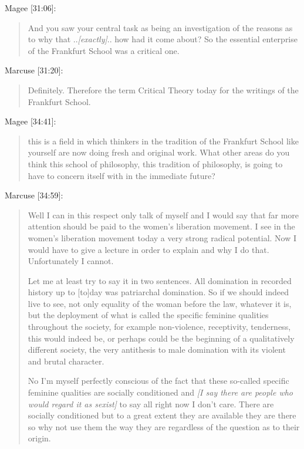 \documentclass[10pt,titlepage]{book}
\newcommand{\ignore}[1]{}
\begin{document}
Magee [31:06]:

\begin{quotation}
And you saw your central task as being an
investigation of the reasons as to why
that ..\emph{[exactly]}..
how had it come about?
So the essential enterprise of the Frankfurt School was a critical one.
\end{quotation}

Marcuse [31:20]:

\begin{quotation}
Definitely.
Therefore the term Critical Theory today for the writings of the Frankfurt School.
\end{quotation}

\ignore{
Magee [31:28]:
  \begin{quotation}
One thing that the members of the
Frankfurt School exhibited very
considerable concern with from the
beginning was the aesthetics, and this I
think differentiates it from most other
philosophies certainly from most other
political philosophies.
\end{quotation}
}%


Magee [34:41]:

\begin{quotation}

this is a field in which thinkers in the tradition of
the Frankfurt School like yourself are now doing fresh and original work.
What other areas do you think this school of philosophy,
this tradition of philosophy,
is going to have to concern itself with in the immediate future?
\end{quotation}

Marcuse [34:59]:

\begin{quotation}
Well I can in this respect only talk of myself and I would say that
far more attention should be paid to the women's liberation movement.
I see in the women's liberation movement today a very strong radical potential.
Now I would have to give a lecture in order to explain and why I do that.
Unfortunately I cannot.

Let me at least try to say it in two sentences.
All domination in recorded history up to [to]day was patriarchal domination.
So if we should indeed live to see, not only equality of the woman before the law,
whatever it is, but the deployment of what is called the specific feminine
qualities throughout the society, for example non-violence, receptivity,
tenderness, this would indeed be, or perhaps could be the beginning of a
qualitatively different society, the very antithesis to male domination with its
violent and brutal character.

No I'm myself perfectly conscious of the fact that these so-called specific
feminine qualities are socially conditioned and \emph{[I say there are people
who would regard it as sexist]} to say all right now I don't care.
There are socially conditioned but to a great extent they are available
they are there so why not use them the way they are regardless of the question
as to their origin.
\end{quotation}
\end{document}
